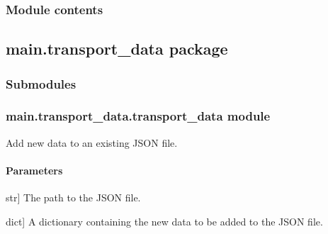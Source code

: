 \documentclass[letterpaper,10pt,english]{sphinxmanual}
\begin{document}
\subsubsection{Module contents}
\label{\detokenize{main.print_data:module-main.print_data}}\label{\detokenize{main.print_data:module-contents}}
\sphinxstepscope


\subsection{main.transport\_data package}
\label{\detokenize{main.transport_data:main-transport-data-package}}\label{\detokenize{main.transport_data::doc}}

\subsubsection{Submodules}
\label{\detokenize{main.transport_data:submodules}}

\subsubsection{main.transport\_data.transport\_data module}
\label{\detokenize{main.transport_data:module-main.transport_data.transport_data}}\label{\detokenize{main.transport_data:main-transport-data-transport-data-module}}

\begin{fulllineitems}
\label{\detokenize{main.transport_data:main.transport_data.transport_data.add_data_to_json}}
\pysigstartsignatures
{}
\pysigstopsignatures
\sphinxAtStartPar
Add new data to an existing JSON file.


\paragraph{Parameters}
\label{\detokenize{main.transport_data:parameters}}\begin{description}
\sphinxlineitem{file\_path}{[}str{]}
\sphinxAtStartPar
The path to the JSON file.

\sphinxlineitem{new\_data}{[}dict{]}
\sphinxAtStartPar
A dictionary containing the new data to be added to the JSON file.

\end{description}

\end{fulllineitems}
\end{document}
